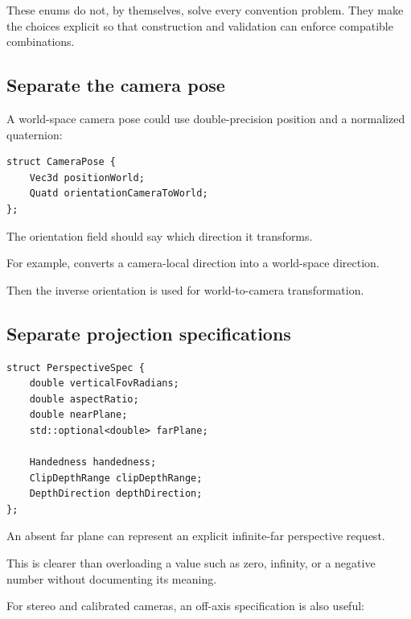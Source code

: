 These enums do not, by themselves, solve every convention problem. They make the choices explicit so that construction and validation can enforce compatible combinations.

\subsection{Separate the camera pose}\label{02-foundations-ii-ch037-separate-the-camera-pose}

\hypertarget{02-foundations-ii-ch037-separate-the-camera-pose}{}

A world-space camera pose could use double-precision position and a normalized quaternion:

\begin{verbatim}
struct CameraPose {
    Vec3d positionWorld;
    Quatd orientationCameraToWorld;
};
\end{verbatim}

The orientation field should say which direction it transforms.

For example,  converts a camera-local direction into a world-space direction.

Then the inverse orientation is used for world-to-camera transformation.

\subsection{Separate projection specifications}\label{02-foundations-ii-ch037-separate-projection-specifications}

\hypertarget{02-foundations-ii-ch037-separate-projection-specifications}{}

\begin{verbatim}
struct PerspectiveSpec {
    double verticalFovRadians;
    double aspectRatio;
    double nearPlane;
    std::optional<double> farPlane;

    Handedness handedness;
    ClipDepthRange clipDepthRange;
    DepthDirection depthDirection;
};
\end{verbatim}

An absent far plane can represent an explicit infinite-far perspective request.

This is clearer than overloading a value such as zero, infinity, or a negative number without documenting its meaning.

For stereo and calibrated cameras, an off-axis specification is also useful:

